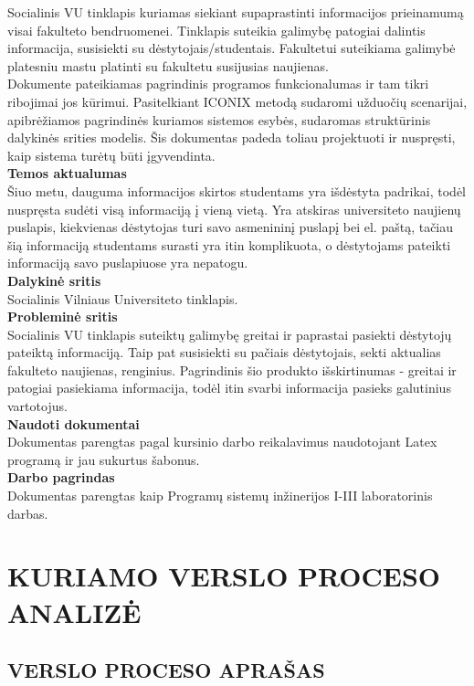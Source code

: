 \documentclass{VUMIFPSkursinis}
\begin{document}
Socialinis VU tinklapis kuriamas siekiant supaprastinti informacijos prieinamumą visai fakulteto bendruomenei. Tinklapis suteikia galimybę patogiai dalintis informacija, susisiekti su dėstytojais/studentais. Fakultetui suteikiama galimybė platesniu mastu platinti su fakultetu susijusias naujienas. \\
Dokumente pateikiamas pagrindinis programos funkcionalumas ir tam tikri ribojimai jos
kūrimui. Pasitelkiant ICONIX metodą sudaromi užduočių scenarijai, apibrėžiamos pagrindinės
kuriamos sistemos esybės, sudaromas struktūrinis dalykinės srities modelis. Šis dokumentas
padeda toliau projektuoti ir nuspręsti, kaip sistema turėtų būti įgyvendinta.\\
\textbf{Temos aktualumas} \\
Šiuo metu, dauguma informacijos skirtos studentams yra išdėstyta padrikai, todėl nuspręsta sudėti visą informaciją į vieną vietą. Yra atskiras universiteto naujienų puslapis, kiekvienas dėstytojas turi savo asmenininį puslapį bei el. paštą, tačiau šią informaciją studentams surasti yra itin komplikuota, o dėstytojams pateikti informaciją savo puslapiuose yra nepatogu.\\
\textbf{Dalykinė sritis}\\
Socialinis Vilniaus Universiteto tinklapis.\\
 \textbf{Probleminė sritis}\\
Socialinis VU tinklapis suteiktų galimybę greitai ir paprastai pasiekti dėstytojų pateiktą informaciją. Taip pat susisiekti su pačiais dėstytojais, sekti aktualias fakulteto naujienas, renginius. Pagrindinis šio produkto išskirtinumas - greitai ir patogiai pasiekiama informacija, todėl itin svarbi informacija pasieks galutinius vartotojus.\\
 \textbf{Naudoti dokumentai}\\
 Dokumentas parengtas pagal kursinio darbo reikalavimus naudotojant Latex programą ir jau
sukurtus šabonus.
\\
 \textbf{Darbo pagrindas} \\ 
Dokumentas parengtas kaip Programų sistemų inžinerijos I-III laboratorinis darbas.
\newpage
\section{KURIAMO VERSLO PROCESO ANALIZĖ}
\subsection{VERSLO PROCESO APRAŠAS}
\end{document}
